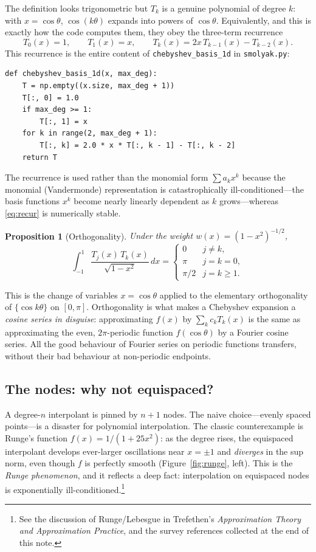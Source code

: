 \documentclass[11pt]{article}
\newtheorem{proposition}{Proposition}
\newcommand{\Tcheb}{T}
\newcommand{\code}[1]{\texttt{#1}}
\begin{document}
\noindent The definition looks trigonometric but $\Tcheb_k$ is a genuine
polynomial of degree $k$: with $x=\cos\theta$, $\cos(k\theta)$ expands into
powers of $\cos\theta$. Equivalently, and this is exactly how the code
computes them, they obey the three-term recurrence
\begin{equation}
\Tcheb_0(x)=1,\qquad \Tcheb_1(x)=x,\qquad
\Tcheb_{k}(x)=2x\,\Tcheb_{k-1}(x)-\Tcheb_{k-2}(x).
\label{eq:recur}
\end{equation}
This recurrence is the entire content of \code{chebyshev\_basis\_1d} in
\code{smolyak.py}:
\begin{verbatim}
def chebyshev_basis_1d(x, max_deg):
    T = np.empty((x.size, max_deg + 1))
    T[:, 0] = 1.0
    if max_deg >= 1:
        T[:, 1] = x
    for k in range(2, max_deg + 1):
        T[:, k] = 2.0 * x * T[:, k - 1] - T[:, k - 2]
    return T
\end{verbatim}
The recurrence is used rather than the monomial form $\sum a_k x^k$ because
the monomial (Vandermonde) representation is catastrophically
ill-conditioned---the basis functions $x^k$ become nearly linearly
dependent as $k$ grows---whereas \eqref{eq:recur} is numerically stable.

\begin{proposition}[Orthogonality]
Under the weight $w(x)=(1-x^2)^{-1/2}$,
\[
\int_{-1}^{1}\frac{\Tcheb_j(x)\,\Tcheb_k(x)}{\sqrt{1-x^2}}\,dx
=\begin{cases}0 & j\neq k,\\ \pi & j=k=0,\\ \pi/2 & j=k\ge 1.\end{cases}
\]
\end{proposition}
This is the change of variables $x=\cos\theta$ applied to the elementary
orthogonality of $\{\cos k\theta\}$ on $[0,\pi]$. Orthogonality is what makes
a Chebyshev expansion a \emph{cosine series in disguise}: approximating
$f(x)$ by $\sum_k c_k \Tcheb_k(x)$ is the same as approximating the even,
$2\pi$-periodic function $f(\cos\theta)$ by a Fourier cosine series. All the
good behaviour of Fourier series on periodic functions transfers, without
their bad behaviour at non-periodic endpoints.

\subsection{The nodes: why not equispaced?}
\label{sec:runge}

A degree-$n$ interpolant is pinned by $n+1$ nodes. The naive choice---evenly
spaced points---is a disaster for polynomial interpolation. The classic
counterexample is Runge's function $f(x)=1/(1+25x^2)$: as the degree rises,
the equispaced interpolant develops ever-larger oscillations near
$x=\pm1$ and \emph{diverges} in the sup norm, even though $f$ is perfectly
smooth (Figure~\ref{fig:runge}, left). This is the \emph{Runge phenomenon},
and it reflects a deep fact: interpolation on equispaced nodes is
exponentially ill-conditioned.\footnote{See the discussion of
Runge/Lebesgue in Trefethen's \emph{Approximation Theory and Approximation
Practice}, and the survey references collected at the end of this note.}
\end{document}
